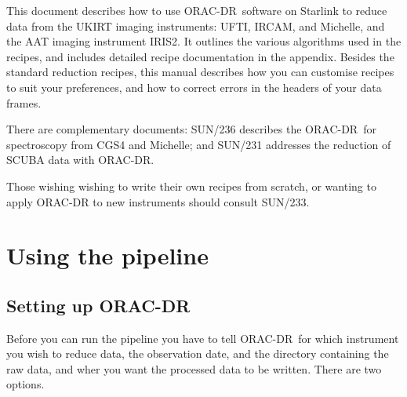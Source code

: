 \documentclass[twoside,11pt]{article}
\newcommand{\xref}[3]{#1}
\newcommand{\xlabel}[1]{}
\renewcommand{\_}{\texttt{\symbol{95}}}
\newcommand{\ORACDR}{{\footnotesize ORAC-DR}}
\begin{document}
This document describes how to use \ORACDR\ software on Starlink to
reduce data from the UKIRT imaging instruments: UFTI, IRCAM, and
Michelle, and the AAT imaging instrument IRIS2.  It outlines the
various algorithms used in the recipes, and
includes detailed recipe documentation in the appendix.  Besides the
standard reduction recipes, this manual describes how you can
customise recipes to suit your preferences, and how to correct errors
in the headers of your data frames.

There are complementary documents: \xref{SUN/236}{sun236}{} describes the
\ORACDR\ for spectroscopy from CGS4 and Michelle; and \xref{SUN/231}{sun231}{}
addresses the reduction of SCUBA data with \ORACDR.



Those wishing wishing to write their own recipes from scratch, or wanting
to apply ORAC-DR to new instruments should consult \xref{SUN/233}{sun233}{}.

\section{\xlabel{using_the_pipeline}Using the pipeline\label{using_the_pipeline}}

\subsection{\xlabel{setting_up_orac-dr}Setting up \ORACDR\label{setting_up_orac-dr}}

Before you can run the pipeline you have to tell \ORACDR\ for which
instrument you wish to reduce data, the observation date, and the
directory containing the raw data, and wher you want the processed
data to be written.  There are two options.
\end{document}
